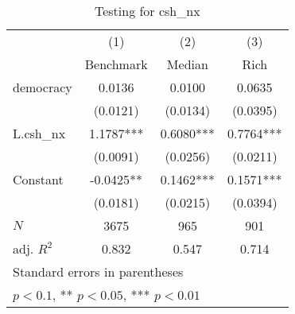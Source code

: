 \begin{table}[htbp]\centering
\def\sym#1{\ifmmode^{#1}\else\(^{#1}\)\fi}
\caption{Testing for csh\_nx \label{tab:regression3}}
\begin{tabular}{l*{3}{c}}
\hline\hline
            &\multicolumn{1}{c}{(1)}&\multicolumn{1}{c}{(2)}&\multicolumn{1}{c}{(3)}\\
            &\multicolumn{1}{c}{Benchmark}&\multicolumn{1}{c}{Median}&\multicolumn{1}{c}{Rich}\\
\hline
democracy   &      0.0136   &      0.0100   &      0.0635   \\
            &    (0.0121)   &    (0.0134)   &    (0.0395)   \\
[1em]
L.csh\_nx    &      1.1787***&      0.6080***&      0.7764***\\
            &    (0.0091)   &    (0.0256)   &    (0.0211)   \\
[1em]
Constant    &     -0.0425** &      0.1462***&      0.1571***\\
            &    (0.0181)   &    (0.0215)   &    (0.0394)   \\
\hline
\(N\)       &        3675   &         965   &         901   \\
adj. \(R^{2}\)&       0.832   &       0.547   &       0.714   \\
\hline\hline
\multicolumn{4}{l}{\footnotesize Standard errors in parentheses}\\
\multicolumn{4}{l}{\footnotesize * \(p<0.1\), ** \(p<0.05\), *** \(p<0.01\)}\\
\end{tabular}
\end{table}

